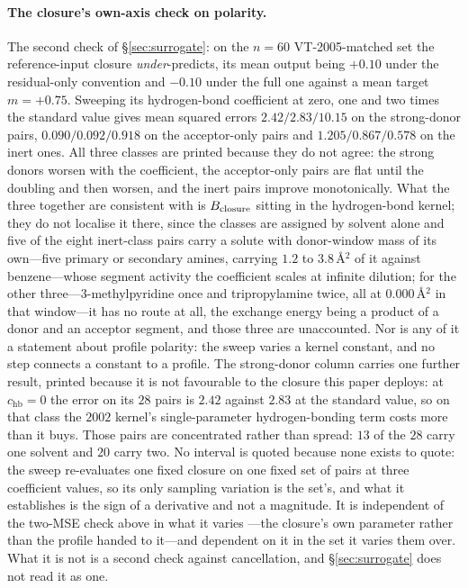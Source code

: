 \paragraph{The closure's own-axis check on polarity.}
\label{par:own-axis}
The second check of \S\ref{sec:surrogate}: on
the $n{=}60$ VT-2005-matched set the reference-input closure \emph{under}-predicts, its mean output being $+0.10$
under the residual-only convention and $-0.10$ under the full one against a mean target
$m=+0.75$. Sweeping its hydrogen-bond coefficient at zero, one and two times the standard value
gives mean squared errors $2.42/2.83/10.15$ on the strong-donor pairs, $0.090/0.092/0.918$ on the
acceptor-only pairs and $1.205/0.867/0.578$ on the inert ones. All three classes are printed because
they do not agree: the strong donors worsen with the coefficient, the acceptor-only pairs are flat
until the doubling and then worsen, and the inert pairs improve monotonically. What the three
together are consistent with is $B_{\mathrm{closure}}$ sitting in the hydrogen-bond kernel; they do not localise it
there, since the classes are assigned by solvent alone and five of the eight inert-class pairs carry a
solute with donor-window mass of its own---five primary or secondary amines, carrying $1.2$ to
$3.8$\,\AA$^2$ of it against benzene---whose segment activity the coefficient scales at infinite
dilution; for the other three---$3$-methylpyridine once and tripropylamine twice, all at $0.000$\,\AA$^2$
in that window---it has no route at all, the exchange energy being a product of a donor and an
acceptor segment, and those three are unaccounted. Nor
is any of it a statement about profile polarity: the sweep varies a kernel constant, and no step
connects a constant to a profile. The strong-donor column carries one further result, printed
because it is not favourable to the closure this paper deploys: at $c_{\mathrm{hb}}=0$ the error on
its $28$ pairs is $2.42$ against $2.83$ at the standard value, so on that class the $2002$ kernel's
single-parameter hydrogen-bonding term costs more than it buys. Those pairs are concentrated rather
than spread: $13$ of the $28$ carry one solvent and $20$ carry two. No interval is quoted because none
exists to quote: the sweep re-evaluates one fixed closure on one fixed set of pairs at three
coefficient values, so its only sampling variation is the set's, and what it establishes is the sign
of a derivative and not a magnitude. It is independent of the two-MSE check above in what it varies
---the closure's own parameter rather than the profile handed to it---and dependent on it in the set
it varies them over. What it is not is a second check against cancellation, and \S\ref{sec:surrogate}
does not read it as one.

